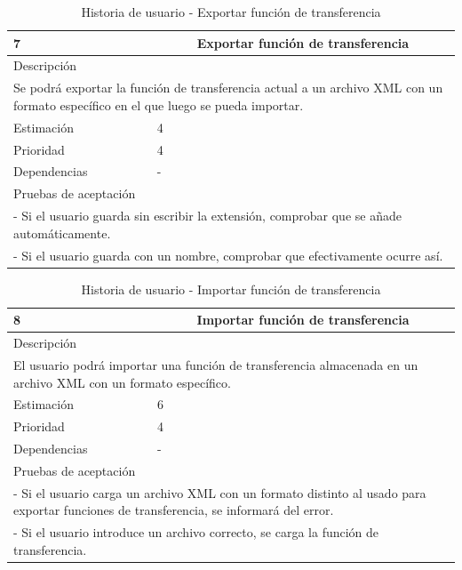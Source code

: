 \begin{table}[H]
	\begin{center}
		\begin{tabular} {|l|c|l|}
			\hline
			7 & \multicolumn{2}{c|}{Exportar función de transferencia} \\ \hline \hline
			\multicolumn{3}{|l|}{Descripción} \\ \hline
			\multicolumn{3}{|p{12cm}|}{Se podrá exportar la función de transferencia actual a un archivo XML con un formato específico en el que luego se pueda importar.} \\ \hline
			\multicolumn{2}{|l|}{Estimación} & 4 \\ \hline
			\multicolumn{2}{|l|}{Prioridad} & 4 \\ \hline
			\multicolumn{2}{|l|}{Dependencias} & - \\ \hline
			\multicolumn{3}{|l|}{Pruebas de aceptación} \\ \hline
			\multicolumn{3}{|p{12cm}|}{ - Si el usuario guarda sin escribir la extensión, comprobar que se añade automáticamente.} \\
			\multicolumn{3}{|p{12cm}|}{ - Si el usuario guarda con un nombre, comprobar que efectivamente ocurre así.} \\ \hline
		\end{tabular}
	\end{center}
	\caption{Historia de usuario - Exportar función de transferencia}
	\label{tab:hu_exportar_funcion_de_transferencia}
\end{table}

\begin{table}[H]
	\begin{center}
		\begin{tabular} {|l|c|l|}
			\hline
			8 & \multicolumn{2}{c|}{Importar función de transferencia} \\ \hline \hline
			\multicolumn{3}{|l|}{Descripción} \\ \hline
			\multicolumn{3}{|p{12cm}|}{El usuario podrá importar una función de transferencia almacenada en un archivo XML con un formato específico.} \\ \hline
			\multicolumn{2}{|l|}{Estimación} & 6 \\ \hline
			\multicolumn{2}{|l|}{Prioridad} & 4 \\ \hline
			\multicolumn{2}{|l|}{Dependencias} & - \\ \hline
			\multicolumn{3}{|l|}{Pruebas de aceptación} \\ \hline
			\multicolumn{3}{|p{12cm}|}{ - Si el usuario carga un archivo XML con un formato distinto al usado para exportar funciones de transferencia, se informará del error.} \\
			\multicolumn{3}{|p{12cm}|}{ - Si el usuario introduce un archivo correcto, se carga la función de transferencia.} \\ \hline
		\end{tabular}
	\end{center}
	\caption{Historia de usuario - Importar función de transferencia}
	\label{tab:hu_importar_funcion_de_transferencia}
\end{table}

